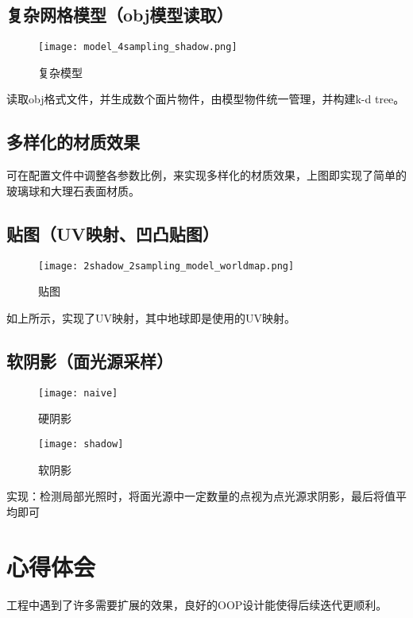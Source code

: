 \documentclass[12pt, a4paper, UTF8]{article}
\begin{document}
\subsection{复杂网格模型（obj模型读取）}
	\begin{figure}[h]
		\centering
		\texttt{[image: model\_4sampling\_shadow.png]}
			\caption{复杂模型}	
	\end{figure}\newpage
读取obj格式文件，并生成数个面片物件，由模型物件统一管理，并构建k-d tree。
\subsection{多样化的材质效果}
可在配置文件中调整各参数比例，来实现多样化的材质效果，上图即实现了简单的玻璃球和大理石表面材质。
\subsection{贴图（UV映射、凹凸贴图）}
	\begin{figure}[h]
		\centering
		\texttt{[image: 2shadow\_2sampling\_model\_worldmap.png]}
			\caption{贴图}
	\end{figure}\newpage	
如上所示，实现了UV映射，其中地球即是使用的UV映射。
\subsection{软阴影（面光源采样）}
	\begin{figure}[h]
		\centering
		\texttt{[image: naive]}
			\caption{硬阴影}	
	\end{figure}
	\begin{figure}[h]
		\centering
		\texttt{[image: shadow]}
			\caption{软阴影}	
	\end{figure}
实现：检测局部光照时，将面光源中一定数量的点视为点光源求阴影，最后将值平均即可
\par
\section{心得体会}
工程中遇到了许多需要扩展的效果，良好的OOP设计能使得后续迭代更顺利。


\end{document}
